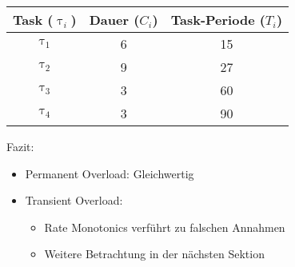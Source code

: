 \newcommand{\showRMSlideRob}[1] {\begin{frame}{\subsubsecname}
	\begin{center}
		\begin{tabular}{c||c|c}
			Task ($\uptau_i$) & Dauer ($C_i$) & Task-Periode ($T_i$)\\\hline\hline
			$\uptau_1$ & 6 & 15\\
			$\uptau_2$ & 9 & 27\\
			$\uptau_3$ & 3 & 60\\
			$\uptau_4$ & 3 & 90
		\end{tabular}
	\end{center}
	
\end{frame}}

%
{%
	\showRMSlideRob{\arabic{ct}}
}

\begin{frame}{\subsecname}
	Fazit:
	\begin{itemize}
		\item Permanent Overload: Gleichwertig
		\item Transient Overload:
		\begin{itemize}
			\item Rate Monotonics verführt zu falschen Annahmen
			\item Weitere Betrachtung in der nächsten Sektion
		\end{itemize}
	\end{itemize}
\end{frame}